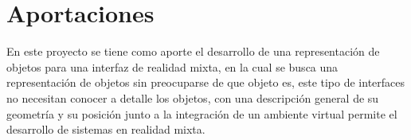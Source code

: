 
\section{Aportaciones}

	En este proyecto se tiene como aporte el desarrollo de una representación de objetos para una interfaz de realidad mixta, en la cual se busca una representación de objetos sin preocuparse de que objeto es, este tipo de interfaces no necesitan conocer a detalle los objetos, con una descripción general de su geometría y su posición junto a la integración de un ambiente virtual permite el desarrollo de sistemas en realidad mixta.\\